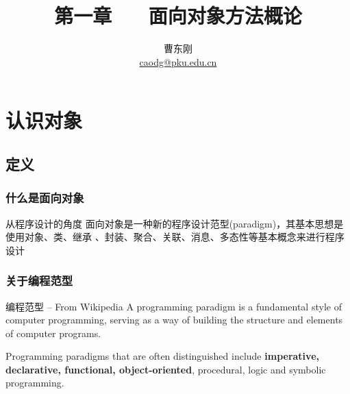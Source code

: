 \documentclass[compress]{beamer}
\begin{document}

					
\title{第一章 ~~ 面向对象方法概论}

\author[面向对象的分析与设计]
{曹东刚\\\href{mailto:caodg@pku.edu.cn}{caodg@pku.edu.cn}}



\date{}


\begin{frame}[plain]
	\titlepage
\end{frame}


\setcounter{framenumber}{0}

\section{认识对象}

\subsection{定义}

\begin{frame}
\frametitle{什么是面向对象}
\begin{block}{从程序设计的角度}
面向对象是一种新的程序设计范型(paradigm)，其基本思想是使用对象、类、继承
、封装、聚合、关联、消息、多态性等基本概念来进行程序设计
\end{block}
\end{frame}

\begin{frame}
    \frametitle{关于编程范型}

\begin{block}{编程范型 -- From Wikipedia}
    A programming paradigm is a fundamental style of computer
    programming, serving as a way of building the structure and elements
    of computer programs. 
\end{block}

    Programming paradigms that are often distinguished include
    \textbf{imperative, declarative, functional, object-oriented}, procedural,
    logic and symbolic programming.


\end{frame}
\end{document}
